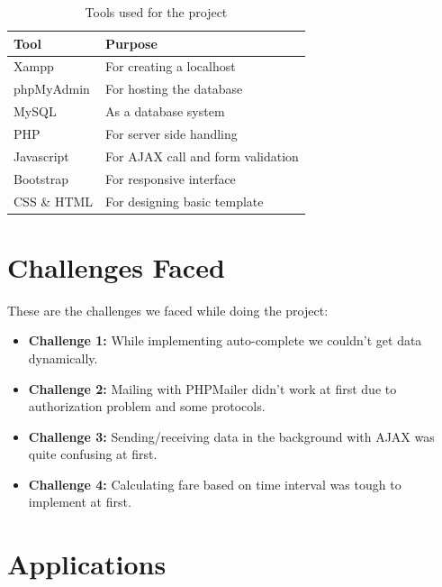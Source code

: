 \begin{table}[H]
\centering
\caption{Tools used for the project}
\label{my-label}
\begin{tabular}{|l|l|}
\hline
\textbf{Tool} & \textbf{Purpose}         \\ \hline
Xampp         & For creating a localhost \\ \hline
phpMyAdmin    & For hosting the database \\ \hline
MySQL    	  & As a database system \\ \hline
PHP    		  & For server side handling \\ \hline
Javascript    & For AJAX call and form validation \\ \hline
Bootstrap     & For responsive interface \\ \hline
CSS \& HTML   & For designing basic template \\ \hline
\end{tabular}
\end{table}

\clearpage

\section{Challenges Faced}
These are the challenges we faced while doing the project:
\begin{itemize}
\item \textbf{Challenge 1: } While implementing auto-complete we couldn't get data dynamically.
\item \textbf{Challenge 2: } Mailing with PHPMailer didn't work at first due to authorization problem and some protocols.
\item \textbf{Challenge 3: } Sending/receiving data in the background with AJAX was quite confusing at first.
\item \textbf{Challenge 4: } Calculating fare based on time interval was tough to implement at first.
\end{itemize}

\clearpage

\section{Applications}

